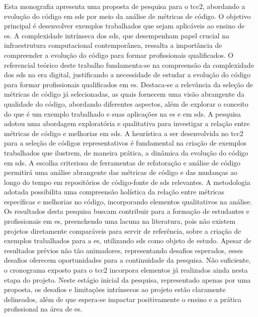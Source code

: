 
\begin{resumoutfpr}%

Esta monografia apresenta uma proposta de pesquisa para o \gls{tcc2}, abordando a evolução do código em \gls{sds} por meio da análise de métricas de código. O objetivo principal é desenvolver exemplos trabalhados que sejam aplicáveis ao ensino de \gls{es}. A complexidade intrínseca dos \gls{sds}, que desempenham papel crucial na infraestrutura computacional contemporânea, ressalta a importância de compreender a evolução do código para formar profissionais qualificados. O referencial teórico deste trabalho fundamenta-se na compreensão da complexidade dos \gls{sds} na era digital, justificando a necessidade de estudar a evolução do código para formar profissionais qualificados em \gls{es}. Destaca-se a relevância da seleção de métricas de código já selecionadas, as quais fornecem uma visão abrangente da qualidade do código, abordando diferentes aspectos, além de explorar o conceito do que é um exemplo trabalhado e suas aplicações na \gls{es} e em \gls{sds}. A pesquisa adotou uma abordagem exploratória e qualitativa para investigar a relação entre métricas de código e melhorias em \gls{sds}. A heurística a ser desenvolvida no \gls{tcc2} para a seleção de códigos representativos é fundamental na criação de exemplos trabalhados que ilustrem, de maneira prática, a dinâmica da evolução do código em \gls{sds}. A escolha criteriosa de ferramentas de refatoração e análise de código permitirá uma análise abrangente das métricas de código e das mudanças ao longo do tempo em repositórios de código-fonte de \gls{sds} relevantes. A metodologia adotada possibilita uma compreensão holística da relação entre métricas específicas e melhorias no código, incorporando elementos qualitativos na análise. Os resultados desta pesquisa buscam contribuir para a formação de estudantes e profissionais em \gls{es}, preenchendo uma lacuna na literatura, pois não existem projetos diretamente comparáveis para servir de referência, sobre a criação de exemplos trabalhados para a \gls{es}, utilizando \gls{sds} como objeto de estudo. Apesar de resultados prévios não tão animadores, representando desafios esperados, esses desafios oferecem oportunidades para a continuidade da pesquisa. Não suficiente, o cronograma exposto para o \gls{tcc2} incorpora elementos já realizados ainda nesta etapa do projeto. Neste estágio inicial da pesquisa, representado apenas por uma proposta, os desafios e limitações intrínsecos ao projeto estão claramente delineados, além de que espera-se impactar positivamente o ensino e a prática profissional na área de \gls{es}.

\end{resumoutfpr}
